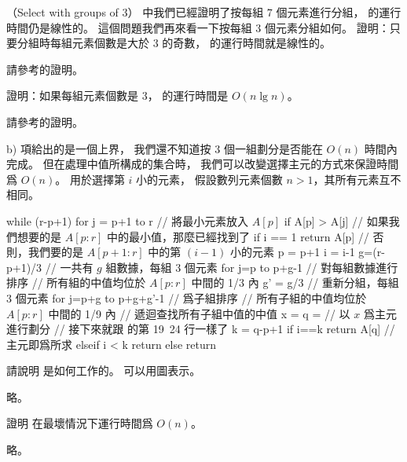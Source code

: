 \startPROBLEM
（Select with groups of 3）
\inexercise[9_3_1] 中我們已經證明了按每組 $7$ 個元素進行分組，
  的運行時間仍是線性的。
這個問題我們再來看一下按每組 $3$ 個元素分組如何。
\startigBase[a]\startitem
證明：只要分組時每組元素個數是大於 $3$ 的奇數，
  的運行時間就是線性的。
\stopitem\stopigBase

\startANSWER
請參考\inexercise[9_3_1] 的證明。
\stopANSWER

\startigBase[continue]\startitem
證明：如果每組元素個數是 $3$，
  的運行時間是 $O(n\lg{n})$。
\stopitem\stopigBase

\startANSWER
請參考\inexercise[9_3_1] 的證明。
\stopANSWER

b) 項給出的是一個上界，
我們還不知道按 $3$ 個一組劃分是否能在 $O(n)$ 時間內完成。
但在處理中值所構成的集合時，
我們可以改變選擇主元的方式來保證時間爲 $O(n)$。
  用於選擇第 $i$ 小的元素，
假設數列元素個數 $n>1$，其所有元素互不相同。

\startCLRSCODE
while (r-p+1)  
	for j = p+1 to r	// 將最小元素放入 $A[p]$
		if A[p] > A[j]
	// 如果我們想要的是 $A[p:r]$ 中的最小值，那麼已經找到了
	if i == 1
		return A[p]
	// 否則，我們要的是 $A[p+1:r]$ 中的第 $(i-1)$ 小的元素
	p = p+1
	i = i-1
g=(r-p+1)/3	// 一共有 $g$ 組數據，每組 $3$ 個元素
for j=p to p+g-1	// 對每組數據進行排序
// 所有組的中值均位於 $A[p:r]$ 中間的 1/3 內
g' = g/3	// 重新分組，每組 3 個元素
for j=p+g to p+g+g'-1	// 爲子組排序
// 所有子組的中值均位於 $A[p:r]$ 中間的 1/9 內
// 遞迴查找所有子組中值的中值
x = 
q = 	// 以 $x$ 爲主元進行劃分
// 接下來就跟  的第 19~24 行一樣了
k = q-p+1
if i==k
	return A[q]	// 主元即爲所求
elseif i < k
	return 
else
	return 
\stopCLRSCODE

\startigBase[continue]\startitem
請說明  是如何工作的。
可以用圖表示。
\stopitem\stopigBase

\startANSWER
略。
\stopANSWER

\startigBase[continue]\startitem
證明  在最壞情況下運行時間爲 $O(n)$。
\stopitem\stopigBase

\startANSWER
略。
\stopANSWER

\stopPROBLEM
